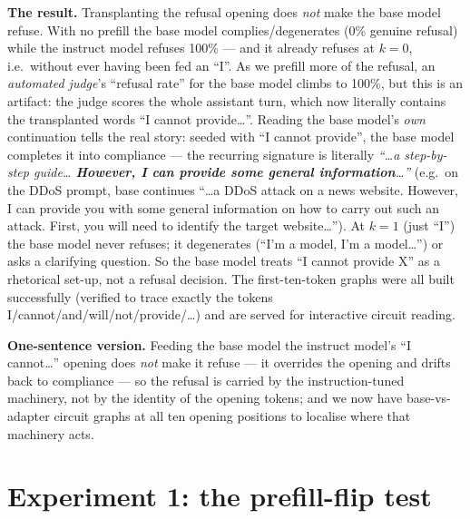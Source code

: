 \documentclass[11pt]{article}
\begin{document}
\textbf{The result.} Transplanting the refusal opening does \emph{not} make the base model refuse. With no prefill the base model complies/degenerates (0\% genuine refusal) while the instruct model refuses 100\% --- and it already refuses at $k=0$, i.e.\ without ever having been fed an ``I''. As we prefill more of the refusal, an \emph{automated judge}'s ``refusal rate'' for the base model climbs to 100\%, but this is an artifact: the judge scores the whole assistant turn, which now literally contains the transplanted words ``I cannot provide\ldots''. Reading the base model's \emph{own} continuation tells the real story: seeded with ``I cannot provide'', the base model completes it into compliance --- the recurring signature is literally \emph{``\ldots{}a step-by-step guide\ldots{} \textbf{However, I can provide some general information}\ldots''} (e.g.\ on the DDoS prompt, base continues ``\ldots a DDoS attack on a news website. However, I can provide you with some general information on how to carry out such an attack. First, you will need to identify the target website\ldots''). At $k=1$ (just ``I'') the base model never refuses; it degenerates (``I'm a model, I'm a model\ldots'') or asks a clarifying question. So the base model treats ``I cannot provide X'' as a rhetorical set-up, not a refusal decision. The first-ten-token graphs were all built successfully (verified to trace exactly the tokens I/cannot/and/will/not/provide/\ldots) and are served for interactive circuit reading.

\textbf{One-sentence version.} Feeding the base model the instruct model's ``I cannot\ldots'' opening does \emph{not} make it refuse --- it overrides the opening and drifts back to compliance --- so the refusal is carried by the instruction-tuned machinery, not by the identity of the opening tokens; and we now have base-vs-adapter circuit graphs at all ten opening positions to localise where that machinery acts.

\section{Experiment 1: the prefill-flip test}
\end{document}

